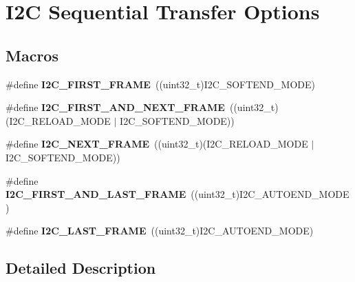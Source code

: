 \hypertarget{group___i2_c___x_f_e_r_o_p_t_i_o_n_s}{}\section{I2C Sequential Transfer Options}
\label{group___i2_c___x_f_e_r_o_p_t_i_o_n_s}
\subsection*{Macros}
\begin{DoxyCompactItemize}
\item 
\mbox{\label{group___i2_c___x_f_e_r_o_p_t_i_o_n_s_gab23601bfc0eaddbc4823d193b7e49a9c}} 
\#define {\bfseries I2\+C\+\_\+\+F\+I\+R\+S\+T\+\_\+\+F\+R\+A\+ME}~((uint32\+\_\+t)I2\+C\+\_\+\+S\+O\+F\+T\+E\+N\+D\+\_\+\+M\+O\+DE)
\item 
\mbox{\label{group___i2_c___x_f_e_r_o_p_t_i_o_n_s_ga1396d7236a5e1d52c9fd6d182d1f2869}} 
\#define {\bfseries I2\+C\+\_\+\+F\+I\+R\+S\+T\+\_\+\+A\+N\+D\+\_\+\+N\+E\+X\+T\+\_\+\+F\+R\+A\+ME}~((uint32\+\_\+t)(I2\+C\+\_\+\+R\+E\+L\+O\+A\+D\+\_\+\+M\+O\+DE $\vert$ I2\+C\+\_\+\+S\+O\+F\+T\+E\+N\+D\+\_\+\+M\+O\+DE))
\item 
\mbox{\label{group___i2_c___x_f_e_r_o_p_t_i_o_n_s_ga8790cd8bea154c662fc6a6d6ef6b9083}} 
\#define {\bfseries I2\+C\+\_\+\+N\+E\+X\+T\+\_\+\+F\+R\+A\+ME}~((uint32\+\_\+t)(I2\+C\+\_\+\+R\+E\+L\+O\+A\+D\+\_\+\+M\+O\+DE $\vert$ I2\+C\+\_\+\+S\+O\+F\+T\+E\+N\+D\+\_\+\+M\+O\+DE))
\item 
\mbox{\label{group___i2_c___x_f_e_r_o_p_t_i_o_n_s_ga56aa81e0fe6ff902f3b0dd0bc9e11b96}} 
\#define {\bfseries I2\+C\+\_\+\+F\+I\+R\+S\+T\+\_\+\+A\+N\+D\+\_\+\+L\+A\+S\+T\+\_\+\+F\+R\+A\+ME}~((uint32\+\_\+t)I2\+C\+\_\+\+A\+U\+T\+O\+E\+N\+D\+\_\+\+M\+O\+DE)
\item 
\mbox{\label{group___i2_c___x_f_e_r_o_p_t_i_o_n_s_gaf732cc5827622242ce14645f67749f40}} 
\#define {\bfseries I2\+C\+\_\+\+L\+A\+S\+T\+\_\+\+F\+R\+A\+ME}~((uint32\+\_\+t)I2\+C\+\_\+\+A\+U\+T\+O\+E\+N\+D\+\_\+\+M\+O\+DE)
\end{DoxyCompactItemize}


\subsection{Detailed Description}
